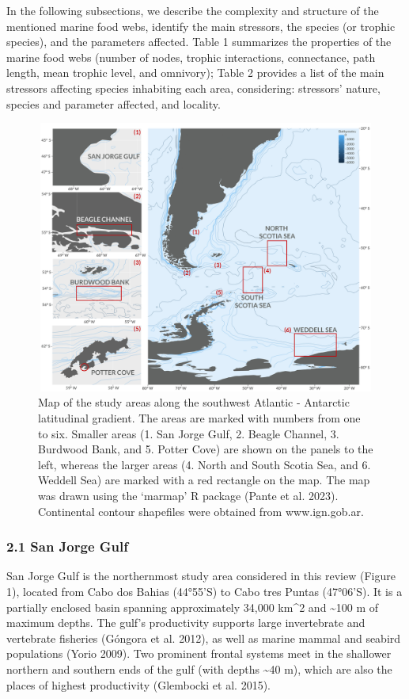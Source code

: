 \documentclass[
]{article}
\begin{document}
In the following subsections, we describe the complexity and structure
of the mentioned marine food webs, identify the main stressors, the
species (or trophic species), and the parameters affected. Table 1
summarizes the properties of the marine food webs (number of nodes,
trophic interactions, connectance, path length, mean trophic level, and
omnivory); Table 2 provides a list of the main stressors affecting
species inhabiting each area, considering: stressors' nature, species
and parameter affected, and locality.

\begin{figure}
\centering
\includegraphics[width=6.27in,height=3.528in]{Figures/Map_final.jpg}
\caption{Map of the study areas along the southwest Atlantic - Antarctic
latitudinal gradient. The areas are marked with numbers from one to six.
Smaller areas (1. San Jorge Gulf, 2. Beagle Channel, 3. Burdwood Bank,
and 5. Potter Cove) are shown on the panels to the left, whereas the
larger areas (4. North and South Scotia Sea, and 6. Weddell Sea) are
marked with a red rectangle on the map. The map was drawn using the
`marmap' R package (Pante et al. 2023). Continental contour shapefiles
were obtained from www.ign.gob.ar.}
\end{figure}

\subsubsection{2.1 San Jorge Gulf}\label{san-jorge-gulf}

San Jorge Gulf is the northernmost study area considered in this review
(Figure 1), located from Cabo dos Bahias (44°55'S) to Cabo tres Puntas
(47°06'S). It is a partially enclosed basin spanning approximately
34,000 km\^{}2 and \textasciitilde100 m of maximum depths. The gulf's
productivity supports large invertebrate and vertebrate fisheries
(Góngora et al. 2012), as well as marine mammal and seabird populations
(Yorio 2009). Two prominent frontal systems meet in the shallower
northern and southern ends of the gulf (with depths \textasciitilde40
m), which are also the places of highest productivity (Glembocki et al.
2015).
\end{document}
